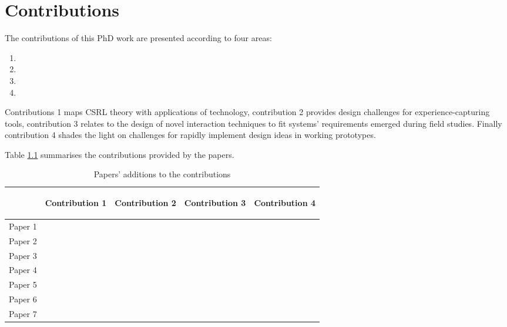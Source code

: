 \chapter{Contributions}\label{contributions}


The contributions of this PhD work are presented according to four areas:

\begin{enumerate}
	\def\labelenumi{\arabic{enumi}.} 
	\itemsep1pt\parskip0pt 
	\item \Ci 
	\item \Cii 
	\item \Ciii 
	\item \Civ
\end{enumerate}

Contributions 1 maps CSRL theory with applications of technology, contribution 2 provides design challenges for experience-capturing tools, contribution 3 relates to the design of novel interaction techniques to fit systems' requirements emerged during field studies. Finally contribution 4 shades the light on challenges for rapidly implement design ideas in working prototypes.

Table \ref{tab:papers-and-contributions} summarises the contributions provided by the papers.

\begin{table}[tbh] 
	\centering 
	\caption{Papers' additions to the contributions} 
	\label{tab:papers-and-contributions} 
	\smallskip
	\begin{tabular}{@{}lcccc@{}}
	\toprule
	  & \begin{turn}{90}Contribution 1\end{turn} & \begin{turn}{90}Contribution 2\end{turn} & \begin{turn}{90}Contribution 3\end{turn} & \begin{turn}{90}Contribution 4\end{turn} \\
	\midrule
	Paper 1 & & & \textbullet & \\
	Paper 2 & \textbullet & \textbullet & & \\
	Paper 3 & & \textbullet & \textbullet & \textbullet \\
	Paper 4 & \textbullet & & & \\
	Paper 5 & & & \textbullet & \textbullet \\
	Paper 6 & \textbullet & & & \\
	Paper 7 & & & & \textbullet \\
	\bottomrule 
	\end{tabular}
\end{table}

